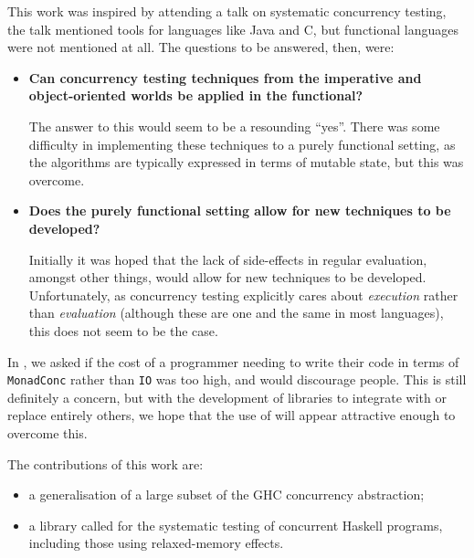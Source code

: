 This work was inspired by attending a talk on systematic concurrency
testing, the talk mentioned tools for languages like Java and C, but
functional languages were not mentioned at all. The questions to be
answered, then, were:

\begin{itemize}
\item \textbf{Can concurrency testing techniques from the imperative
    and object-oriented worlds be applied in the functional?} \hfill

  The answer to this would seem to be a resounding ``yes''. There was
  some difficulty in implementing these techniques to a purely
  functional setting, as the algorithms are typically expressed in
  terms of mutable state, but this was overcome.

\item \textbf{Does the purely functional setting allow for new
    techniques to be developed?} \hfill

  Initially it was hoped that the lack of side-effects in regular
  evaluation, amongst other things, would allow for new techniques to
  be developed. Unfortunately, as concurrency testing explicitly cares
  about \emph{execution} rather than \emph{evaluation} (although these
  are one and the same in most languages), this does not seem to be
  the case.
\end{itemize}

In \citep{dejafu}, we asked if the cost of a programmer needing to
write their code in terms of \verb|MonadConc| rather than \verb|IO|
was too high, and would discourage people. This is still definitely a
concern, but with the development of libraries to integrate with or
replace entirely others, we hope that the use of \dejafu{} will appear
attractive enough to overcome this.

The contributions of this work are:

\begin{itemize}
\item a generalisation of a large subset of the GHC concurrency
  abstraction;

\item a library called \dejafu{} for the systematic testing of
  concurrent Haskell programs, including those using relaxed-memory
  effects.
\end{itemize}
